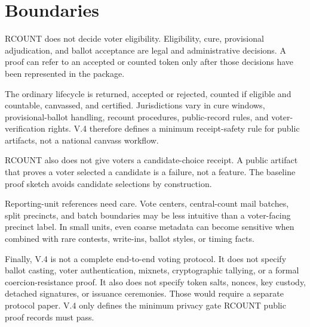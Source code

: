 \section{Boundaries}

RCOUNT does not decide voter eligibility. Eligibility, cure, provisional
adjudication, and ballot acceptance are legal and administrative decisions. A
proof can refer to an accepted or counted token only after those decisions have
been represented in the package.

The ordinary lifecycle is returned, accepted or rejected, counted if eligible
and countable, canvassed, and certified. Jurisdictions vary in cure windows,
provisional-ballot handling, recount procedures, public-record rules, and
voter-verification rights. V.4 therefore defines a minimum receipt-safety rule
for public artifacts, not a national canvass workflow.

RCOUNT also does not give voters a candidate-choice receipt. A public artifact
that proves a voter selected a candidate is a failure, not a feature. The
baseline proof sketch avoids candidate selections by construction.

Reporting-unit references need care. Vote centers, central-count mail batches,
split precincts, and batch boundaries may be less intuitive than a voter-facing
precinct label. In small units, even coarse metadata can become sensitive when
combined with rare contests, write-ins, ballot styles, or timing facts.

Finally, V.4 is not a complete end-to-end voting protocol. It does not specify
ballot casting, voter authentication, mixnets, cryptographic tallying, or a
formal coercion-resistance proof. It also does not specify token salts, nonces,
key custody, detached signatures, or issuance ceremonies. Those would require a
separate protocol paper. V.4 only defines the minimum privacy gate RCOUNT public
proof records must pass.
